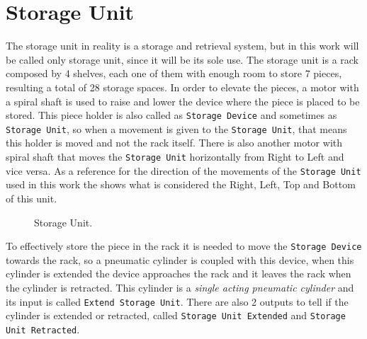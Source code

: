 \section{Storage Unit}
\label{sec:storageUnit}

The storage unit in reality is a storage and retrieval system, but in this work
will be called only storage unit, since it will be its sole use.
The storage unit is a rack composed by 4 shelves, each one of them with enough room to
store 7 pieces, resulting a total of 28 storage spaces. In order to elevate the
pieces, a motor with a spiral shaft is used to raise and lower the device where
the piece is placed to be stored. This piece holder is also called as
\verb|Storage Device| and sometimes as \verb|Storage Unit|, so when a movement
is given to the \verb|Storage Unit|, that means this holder is moved and not the
rack itself.
There is also another motor with spiral shaft that moves the
\verb|Storage Unit|
horizontally from Right to Left and vice versa.
As a reference for the direction of the movements of the
\verb|Storage Unit| used in this work the
 shows what is considered the Right, Left, Top and
Bottom of this unit.

\begin{figure}[H]
  \centering
  \caption{Storage Unit.}
  \label{fig:storageUnit}
\end{figure}
To effectively store the piece in the rack it is needed to move the
\verb|Storage Device| towards the rack, so a pneumatic cylinder is coupled with
this device, when this cylinder is extended the device approaches the rack and
it leaves the rack when the cylinder is retracted. This cylinder is a
\emph{single acting pneumatic cylinder} and its input is called
\verb|Extend Storage Unit|. There are also 2 outputs to tell if the cylinder is
extended or retracted, called \verb|Storage Unit Extended| and
\verb|Storage Unit Retracted|.

